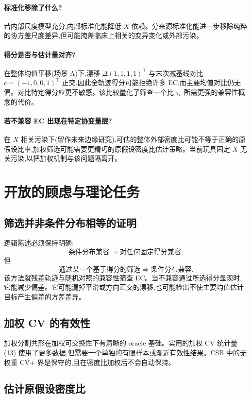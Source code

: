 \documentclass[11pt]{article}
\begin{document}
\paragraph{标准化移除了什么?}
若内部尺度模型充分,内部标准化能降低 $X$ 依赖。分来源标准化能进一步移除纯粹的协方差尺度差异,但可能掩盖临床上相关的变异变化或外部污染。

\paragraph{得分是否与估计量对齐?}
在整体均值平移(场景 A)下,漂移 $\Delta(1,1,1,1)^{\top}$ 与末次减基线对比 $c=(-1,0,0,1)^{\top}$ 正交,因此全轨迹得分可能拒绝许多 EC,而主要均值对比仍无偏。对比特定得分应更不敏感。该比较量化了筛查一个比 $\tau_c$ 所需更强的兼容性概念的代价。

\paragraph{若不兼容 EC 出现在特定协变量层?}
在 $X$ 相关污染下(留作未来边缘研究),可估的整体外部密度比可能不等于正确的原假设比率,加权筛选可能需要更精巧的原假设密度比估计策略。当前玩具固定 $X$ 无关污染,以把加权机制与该问题隔离开。

\section{开放的顾虑与理论任务}

\subsection{筛选并非条件分布相等的证明}

逻辑陈述必须保持明确:
\[
\text{条件分布兼容}
\Longrightarrow
\text{对任何固定得分兼容},
\]
但
\[
\text{通过某一个基于得分的筛选}
\not\Longrightarrow
\text{条件分布兼容}.
\]
该方法就残差轨迹与随机对照的兼容性筛查 EC。当不兼容通过所选得分显现时,它能减少偏差。它可能漏掉平滑或方向正交的漂移,也可能检出不使主要均值估计目标产生偏差的方差差异。

\subsection{加权 CV 的有效性}

加权分割共形在加权可交换性下有清晰的 oracle 基础。实用的加权 CV 统计量 (13) 使用了更多数据,但需要一个单独的有限样本或渐近有效性结果。CSB 中的无权重 CV+ 界是保守的,且在密度比加权后不会自动保持。

\subsection{估计原假设密度比}
\end{document}
